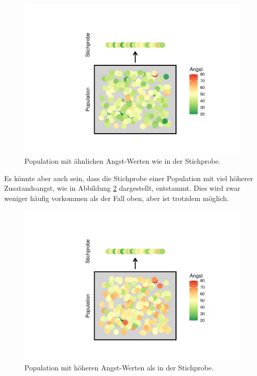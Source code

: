 \documentclass[
]{book}
\theoremstyle{definition}
\theoremstyle{definition}
\theoremstyle{definition}
\theoremstyle{definition}
\theoremstyle{remark}
\begin{document}
\begin{figure}

{\centering \includegraphics{aps_statistik1_files/figure-latex/srs-intervall-high-p-1} 

}

\caption{Population mit ähnlichen Angst-Werten wie in der Stichprobe.}\label{fig:srs-intervall-high-p}
\end{figure}

Es könnte aber auch sein, dass die Stichprobe einer Population mit viel höherer Zusatandsangst, wie in Abbildung \ref{fig:srs-intervall-low-p} dargestellt, entstammt. Dies wird zwar weniger häufig vorkommen als der Fall oben, aber ist trotzdem möglich.

\begin{figure}

{\centering \includegraphics{aps_statistik1_files/figure-latex/srs-intervall-low-p-1} 

}

\caption{Population mit höheren Angst-Werten als in der Stichprobe.}\label{fig:srs-intervall-low-p}
\end{figure}
\end{document}
